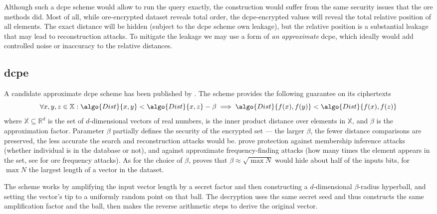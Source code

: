 		Although such a \acrfull{dcpe} scheme would allow to run the query exactly, the construction would suffer from the same security issues that the \acrshort{ore} methods did.
		Most of all, while \acrshort{ore}-encrypted dataset reveals total order, the \acrshort{dcpe}-encrypted values will reveal the total relative position of all elements.
		The exact distance will be hidden (subject to the \acrshort{dcpe} scheme own leakage), but the relative position is a substantial leakage that may lead to reconstruction attacks.
		To mitigate the leakage we may use a form of \emph{an approximate} \acrshort{dcpe}, which ideally would add controlled noise or inaccuracy to the relative distances.

		\subsection{\acrlong{dcpe}}

			A candidate approximate \acrshort{dcpe} scheme has been published by \textcite{dcpe}.
			The scheme provides the following guarantee on its ciphertexts
			\[
				\forall x, y, z \in \mathbb{X} : \algo{Dist}{x, y} < \algo{Dist}{x, z} - \beta \implies \algo{Dist}{f(x), f(y)} < \algo{Dist}{f(x), f(z)}
			\]
			where $\mathbb{X} \subseteq \mathbb{R}^d$ is the set of $d$-dimensional vectors of real numbers,  is the inner product distance over elements in $\mathbb{X}$, and $\beta$ is the approximation factor.
			Parameter $\beta$ partially defines the security of the encrypted set --- the larger $\beta$, the fewer distance comparisons are preserved, the less accurate the search and reconstruction attacks would be.
			\textcite{dcpe} prove protection against membership inference attacks \cite{memebership-inference-attacks-knn} (whether individual is in the database or not), and against approximate frequency-finding attacks (how many times the element appears in the set, see \cite{leakage-abuse-grubs-2017} for \acrshort{ore} frequency attacks).
			As for the choice of $\beta$, \cite{dcpe} proves that $\beta \approx \sqrt{\max N}$ would hide about half of the inputs bits, for $\max N$ the largest length of a vector in the dataset.

			The scheme works by amplifying the input vector length by a secret factor and then constructing a $d$-dimensional $\beta$-radius hyperball, and setting the vector's tip to a uniformly random point on that ball.
			The decryption uses the same secret seed and thus constructs the same amplification factor and the ball, then makes the reverse arithmetic steps to derive the original vector.
